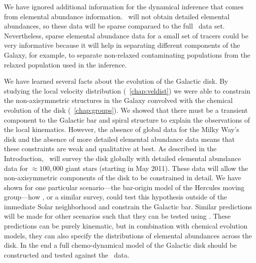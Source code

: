 We have ignored additional information for the dynamical inference
that comes from elemental abundance information. \Gaia\ will not
obtain detailed elemental abundances, so these data will be sparse
comparaed to the full \Gaia\ data set. Nevertheless, sparse elemental
abundance data for a small set of tracers could be very informative
because it will help in separating different components of the Galaxy,
for example, to separate non-relaxed contaminating populations from
the relaxed population used in the inference. 


We have learned several facts about the evolution of the Galactic
disk. By studying the local velocity distribution
(\chaptername~\ref{chap:veldist}) we were able to constrain the
non-axisymmetric structures in the Galaxy convolved with the chemical
evolution of the disk (\chaptername~\ref{chap:groups}). We showed that
there must be a transient component to the Galactic bar and spiral
structure to explain the observations of the local
kinematics. However, the absence of global data for the Milky Way's
disk and the absence of more detailed elemental abundance data means
that these constraints are weak and qualitative at best. As described
in the Introduction, \apogee\ will survey the disk globally with
detailed elemental abundance data for $\approx 100,000$ giant stars
(starting in May 2011). These data will allow the non-axisymmetric
components of the disk to be constrained in detail. We have shown for
one particular scenario---the bar-origin model of the Hercules moving
group---how \apogee, or a similar survey, could test this hypothesis
outside of the immediate Solar neighborhood and constrain the Galactic
bar. Similar predictions will be made for other scenarios such that
they can be tested using \apogee. These predictions can be purely
kinematic, but in combination with chemical evolution models, they can
also specify the distributions of elemental abundances across the
disk. In the end a full chemo-dynamical model of the Galactic disk
should be constructed and tested against the \apogee\ data.

